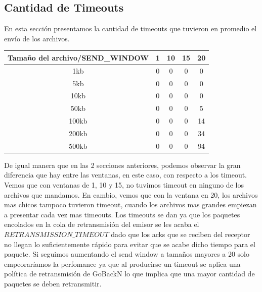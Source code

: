 \subsection{Cantidad de Timeouts}
\indent En esta sección presentamos la cantidad de timeouts que tuvieron en promedio el envío de los archivos.\\
\begin{center}
   \begin{tabular}{| c | c | c | c | c |}
    \hline
    Tamaño del archivo/SEND\_WINDOW & 1 & 10 & 15 & 20\\
    \hline
    1kb & 0 & 0 & 0 & 0 \\
    \hline
    5kb & 0 & 0 & 0 & 0 \\
    \hline
    10kb & 0 & 0 & 0 & 0\\
    \hline
    50kb & 0 & 0 & 0 & 5\\
    \hline
    100kb & 0 & 0 & 0 & 14\\
    \hline
    200kb & 0 & 0 & 0 & 34\\
    \hline
    500kb & 0 & 0 & 0 & 94\\
    \hline
  \end{tabular}
\end{center}

\indent De igual manera que en las 2 secciones anteriores, podemos observar la gran
diferencia que hay entre las ventanas, en este caso, con respecto a los
timeout.\\
\indent Vemos que con ventanas de 1, 10 y 15, no tuvimos timeout en ninguno de
los archivos que mandamos. En cambio, vemos que con la ventana en 20, los
archivos mas chicos tampoco tuvieron timeout, cuando los archivos mas grandes
empiezan a presentar cada vez mas timeouts. Los timeouts se dan ya que los paquetes encolados en la cola de retransmisión del emisor se les acaba el $RETRANSMISSION\_TIMEOUT$ dado que los acks que se reciben del receptor no llegan lo suficientemente rápido para evitar que se acabe dicho tiempo para el paquete. Si seguimos aumentando el send window a tamaños mayores a 20 solo empeoraríamos la perfomance ya que al producirse un timeout se aplica una política de retransmisión de GoBackN lo que implica que una mayor cantidad de paquetes se deben retransmitir.\\

